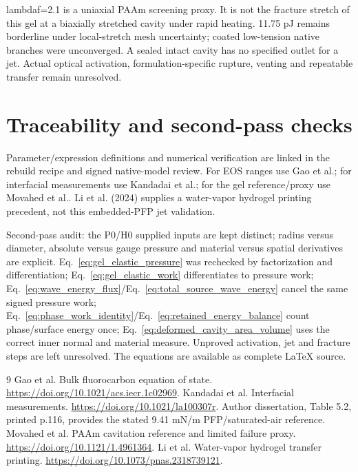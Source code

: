 \documentclass[11pt]{article}
\begin{document}
lambdaf=2.1 is a uniaxial PAAm screening proxy. It is not the fracture stretch of this gel at a biaxially stretched cavity under rapid heating. 11.75 pJ remains borderline under local-stretch mesh uncertainty; coated low-tension native branches were unconverged. A sealed intact cavity has no specified outlet for a jet. Actual optical activation, formulation-specific rupture, venting and repeatable transfer remain unresolved.

\section{Traceability and second-pass checks}\label{sec:references}

Parameter/expression definitions and numerical verification are linked in the rebuild recipe and signed native-model review. For EOS ranges use Gao et al.; for interfacial measurements use Kandadai et al.; for the gel reference/proxy use Movahed et al.. Li et al. (2024) supplies a water-vapor hydrogel printing precedent, not this embedded-PFP jet validation.

Second-pass audit: the P0/H0 supplied inputs are kept distinct; radius versus diameter, absolute versus gauge pressure and material versus spatial derivatives are explicit. Eq.~\eqref{eq:gel_elastic_pressure} was rechecked by factorization and differentiation; Eq.~\eqref{eq:gel_elastic_work} differentiates to pressure work; Eq.~\eqref{eq:wave_energy_flux}/Eq.~\eqref{eq:total_source_wave_energy} cancel the same signed pressure work; Eq.~\eqref{eq:phase_work_identity}/Eq.~\eqref{eq:retained_energy_balance} count phase/surface energy once; Eq.~\eqref{eq:deformed_cavity_area_volume} uses the correct inner normal and material measure. Unproved activation, jet and fracture steps are left unresolved. The equations are available as complete LaTeX source.

\begin{thebibliography}{9}
 Gao et al. Bulk fluorocarbon equation of state. \url{https://doi.org/10.1021/acs.iecr.1c02969}.
 Kandadai et al. Interfacial measurements. \url{https://doi.org/10.1021/la100307r}. Author dissertation, Table 5.2, printed p.116, provides the stated 9.41 mN/m PFP/saturated-air reference.
 Movahed et al. PAAm cavitation reference and limited failure proxy. \url{https://doi.org/10.1121/1.4961364}.
 Li et al. Water-vapor hydrogel transfer printing. \url{https://doi.org/10.1073/pnas.2318739121}.
\end{thebibliography}
\end{document}
